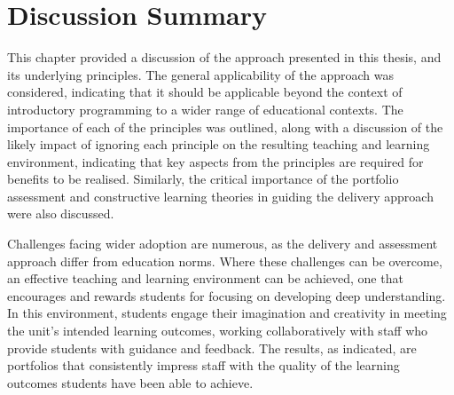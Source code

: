 

\section{Discussion Summary} %
\label{sec:disc_summary}

This chapter provided a discussion of the approach presented in this thesis, and its underlying principles. The general applicability of the approach was considered, indicating that it should be applicable beyond the context of introductory programming to a wider range of educational contexts. The importance of each of the principles was outlined, along with a discussion of the likely impact of ignoring each principle on the resulting teaching and learning environment, indicating that key aspects from the principles are required for benefits to be realised. Similarly, the critical importance of the portfolio assessment and constructive learning theories in guiding the delivery approach were also discussed.

Challenges facing wider adoption are numerous, as the delivery and assessment approach differ from education norms. Where these challenges can be overcome, an effective teaching and learning environment can be achieved, one that encourages and rewards students for focusing on developing deep understanding. In this environment, students engage their imagination and creativity in meeting the unit's intended learning outcomes, working collaboratively with staff who provide students with guidance and feedback. The results, as \citet{Biggs:1996c} indicated, are portfolios that consistently impress staff with the quality of the learning outcomes students have been able to achieve. 





